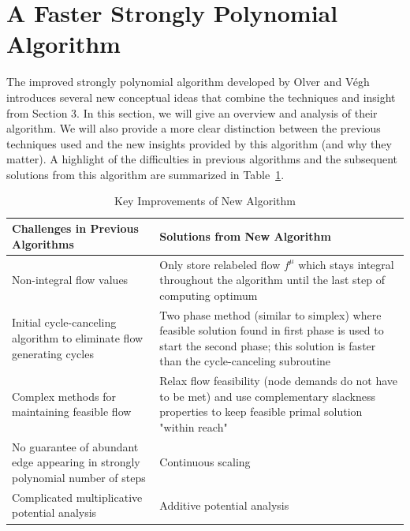 \documentclass[11pt]{article}
\theoremstyle{definition}
\theoremstyle{definition}
\begin{document}
\section{A Faster Strongly Polynomial Algorithm} The improved strongly polynomial algorithm developed by Olver and Végh \cite{Olver2017} introduces several new conceptual ideas that combine the techniques and insight from Section 3. In this section, we will give an overview and analysis of their algorithm. We will also provide a more clear distinction between the previous techniques used and the new insights provided by this algorithm (and why they matter). A highlight of the difficulties in previous algorithms and the subsequent solutions from this algorithm are summarized in Table~\ref{tab:improvements}.

\begin{table}[H]
\begin{center}
    \begin{tabular}{ | p{7cm} | p{7cm} |}
    \hline
    Challenges in Previous Algorithms  & Solutions from New Algorithm \\ \hline
    Non-integral flow values & Only store relabeled flow $f^{\mu}$ which stays integral throughout the algorithm until the last step of computing optimum \\ \hline
    Initial cycle-canceling algorithm to eliminate flow generating cycles & Two phase method (similar to simplex) where feasible solution found in first phase is used to start the second phase; this solution is faster than the cycle-canceling subroutine \\ \hline
    Complex methods for maintaining feasible flow & Relax flow feasibility (node demands do not have to be met) and use complementary slackness properties to keep feasible primal solution "within reach" \\ \hline
    No guarantee of abundant edge appearing in strongly polynomial number of steps \cite{Radzik2004} &  Continuous scaling\\ \hline
    Complicated multiplicative potential analysis \cite{Vegh2013} & Additive potential analysis \\
    \hline
    \end{tabular}
\end{center}
\caption{Key Improvements of New Algorithm}
\label{tab:improvements}
\end{table}
\end{document}
